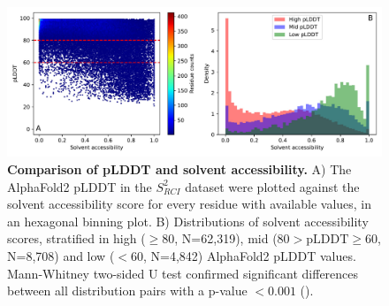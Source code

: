 \begin{figure}[H]
    \centering
    \includegraphics[width=\textwidth]{pLDDT/plddt_figures/plddt_vs_solvent_accessibility_hexbin_hist_undivided.pdf}
    \caption{\textbf{Comparison of pLDDT and solvent accessibility.}
    A) The AlphaFold2 pLDDT in the $S^{2}_{RCI}$ dataset were plotted against the solvent accessibility score for every residue with available values, in an hexagonal binning plot.
    B) Distributions of solvent accessibility scores, stratified in high (\( \geq 80 \), N=62,319), mid (\( 80 > \text{pLDDT} \geq 60 \), N=8,708) and low (\( < 60 \), N=4,842) AlphaFold2 pLDDT values. 
    Mann-Whitney two-sided U test confirmed significant differences between all distribution pairs with a p-value \( < 0.001 \) ().
    }
\label{fig:plddt_vs_solvent_accesibility_undivided}
\end{figure}



